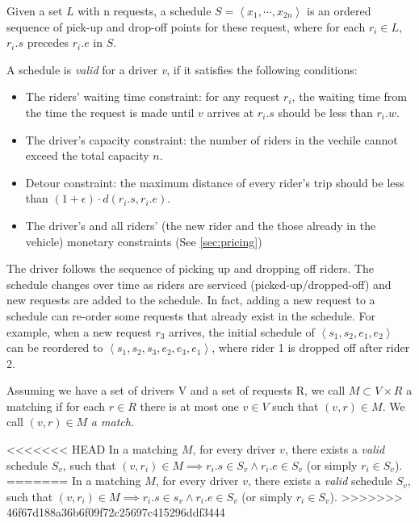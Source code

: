 \begin{definition} 
\begin{definition} [Schedule]
Given a set $L$ with n requests, a schedule $S= \left\langle x_1, \cdots, x_{2n} \right\rangle$ is an ordered sequence of pick-up and drop-off points for these request, where for each $r_i \in L$, $r_i.s$ precedes $r_i.e$ in $S$. 
\end{definition}

A schedule is \textit{valid} for a driver \textit{v}, if it satisfies the following conditions:

\begin{itemize}
\item The riders' waiting time constraint: for any request $r_i$, the waiting time from the time the request is made until $v$ arrives at $r_i.s$ should be less than $r_i.w$.
\item The driver's capacity constraint: the number of riders in the vechile cannot exceed the total capacity $n$.
\item Detour constraint: the maximum distance of every rider's trip should be less than $(1+\epsilon) \cdot d(r_i.s, r_i.e)$.
\item The driver's and all riders' (the new rider and the those already in the vehicle) monetary constraints (See \cref{sec:pricing})
\end{itemize}

The driver follows the sequence of picking up and dropping off riders. The schedule changes over time as riders are serviced (picked-up/dropped-off) and new requests are added to the schedule. In fact, adding a new request to a schedule can re-order some requests that already exist in the schedule. For example, when a new request $r_3$ arrives, the initial schedule of $\left\langle s_1, s_2, e_1, e_2 \right\rangle$ can be reordered to $\left\langle s_1, s_2, s_3, e_2, e_3, e_1 \right\rangle$, where rider 1 is dropped off after rider 2.

\begin{definition} [Matching]
Assuming we have a set of drivers V and a set of requests R, we call $M \subset V \times R$ a matching if for each $r \in R$ there is at most one $v \in V$ such that $\left( v, r \right) \in M$. We call $\left( v, r \right) \in M$ \emph{a match}.
\end{definition}

<<<<<<< HEAD
\noindent In a matching $M$, for every driver $v$, there exists a \textit{valid} schedule $S_v$, such that $(v, r_i) \in M \implies r_i.s \in S_v \wedge r_i.e \in S_v$ (or simply $r_i \in S_v$). 
=======
\noindent In a matching $M$, for every driver $v$, there exists a \textit{valid} schedule $S_v$, such that $(v, r_i) \in M \implies r_i.s \in s_v \wedge r_i.e \in S_v$ (or simply $r_i \in S_v$). 
>>>>>>> 46f67d188a36b6f09f72c25697c415296ddf3444


\end{definition}
